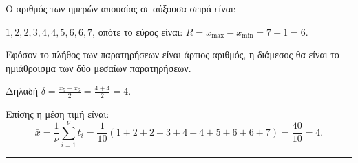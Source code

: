 \begin{alist}
    \item Ο αριθμός των ημερών απουσίας σε αύξουσα σειρά είναι:

    $1, 2, 2, 3, 4, 4, 5, 6, 6, 7$, οπότε το εύρος είναι: $R = x_{\max} - x_{\min} = 7 - 1 = 6$.

    \item Εφόσον το πλήθος των παρατηρήσεων είναι άρτιος αριθμός, η διάμεσος θα είναι το ημιάθροισμα των δύο μεσαίων παρατηρήσεων.

    Δηλαδή $\delta = \frac{x_5 + x_6}{2} = \frac{4+4}{2} = 4$.

    \item Επίσης η μέση τιμή είναι:
    \[
        \bar{x} = \frac{1}{\nu} \sum_{i=1}^{\nu} t_i = \frac{1}{10}(1+2+2+3+4+4+5+6+6+7) = \frac{40}{10} = 4.
    \]
\end{alist}
\vspace{6mm}
\noindent\rule{\textwidth}{0.4pt}
\vspace{6mm}


